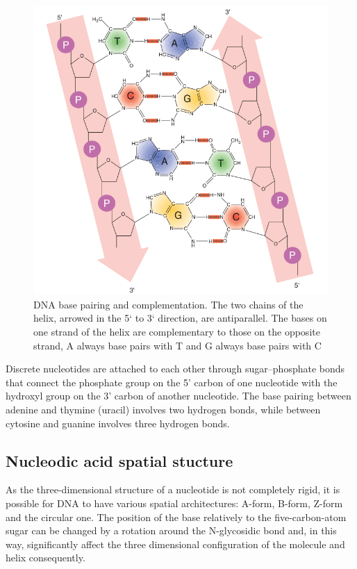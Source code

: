 \begin{figure}[!ht]
	\centering
	\includegraphics[width=.85\textwidth]{figures/nucleotides.png}
	\caption{DNA base pairing and complementation. The two chains of the helix, arrowed in the 5` to 3` direction, are antiparallel. The bases on one strand of the helix
	are complementary to those on the opposite strand, A always base pairs with T and G always base pairs with C \label{o:nucleotide}}
\end{figure}

Discrete nucleotides are attached to each other through sugar–phosphate bonds that connect the phosphate group on the 5’ carbon of one nucleotide with the hydroxyl group on the 3’ carbon of another nucleotide. 
The base pairing between adenine and thymine (uracil) involves two hydrogen bonds, while between cytosine and guanine involves three hydrogen bonds.

\subsection{Nucleodic acid spatial stucture}
As the three-dimensional structure of a nucleotide is not completely rigid, it is possible for DNA to have various spatial architectures: 
A-form, B-form, Z-form and the circular one. The position of the base relatively to the five-carbon-atom sugar can be changed by a rotation 
around the N-glycosidic bond and, in this way, significantly affect the three dimensional configuration of the molecule and helix consequently.

